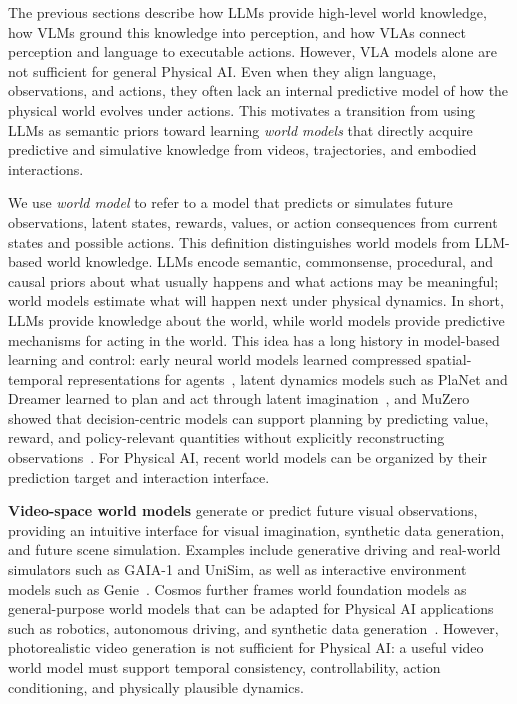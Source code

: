 The previous sections describe how LLMs provide high-level world knowledge, how VLMs ground this knowledge into perception, and how VLAs connect perception and language to executable actions. 
However, VLA models alone are not sufficient for general Physical AI. 
Even when they align language, observations, and actions, they often lack an internal predictive model of how the physical world evolves under actions. 
This motivates a transition from using LLMs as semantic priors toward learning \emph{world models} that directly acquire predictive and simulative knowledge from videos, trajectories, and embodied interactions.

We use \emph{world model} to refer to a model that predicts or simulates future observations, latent states, rewards, values, or action consequences from current states and possible actions. 
This definition distinguishes world models from LLM-based world knowledge. 
LLMs encode semantic, commonsense, procedural, and causal priors about what usually happens and what actions may be meaningful; world models estimate what will happen next under physical dynamics. 
In short, LLMs provide knowledge about the world, while world models provide predictive mechanisms for acting in the world. 
This idea has a long history in model-based learning and control: early neural world models learned compressed spatial-temporal representations for agents~\citep{ha2018world}, latent dynamics models such as PlaNet and Dreamer learned to plan and act through latent imagination~\citep{hafner2019planet,hafner2020dreamer,hafner2023dreamerv3}, and MuZero showed that decision-centric models can support planning by predicting value, reward, and policy-relevant quantities without explicitly reconstructing observations~\citep{schrittwieser2020mastering}.
For Physical AI, recent world models can be organized by their prediction target and interaction interface. 

\noindent\textbf{Video-space world models} generate or predict future visual observations, providing an intuitive interface for visual imagination, synthetic data generation, and future scene simulation. 
Examples include generative driving and real-world simulators such as GAIA-1 and UniSim, as well as interactive environment models such as Genie~\citep{hu2023gaia,yang2023unisim,bruce2024genie}. 
Cosmos further frames world foundation models as general-purpose world models that can be adapted for Physical AI applications such as robotics, autonomous driving, and synthetic data generation~\citep{agarwal2025cosmos}. 
However, photorealistic video generation is not sufficient for Physical AI: a useful video world model must support temporal consistency, controllability, action conditioning, and physically plausible dynamics.

